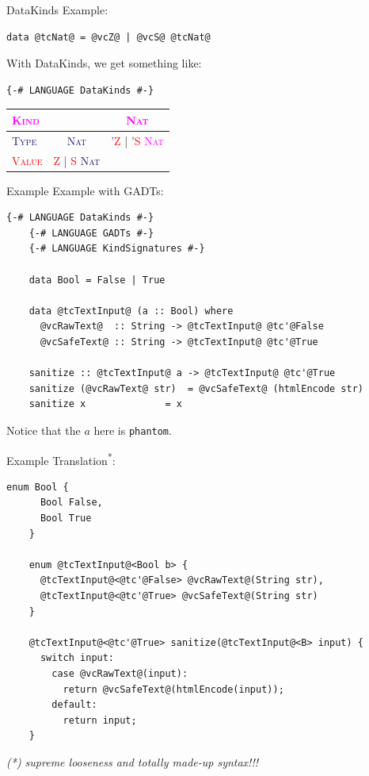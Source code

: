 \documentclass[xcolor={usenames,dvipsnames}]{beamer}
\newcommand{\htycon}[1]{\textcolor{MidnightBlue}{\textsc{#1}}}
\newcommand{\hvalcon}[1]{\textcolor{Red}{\textsc{#1}}}
\newcommand{\hkind}[1]{\textcolor{Fuchsia}{\textsc{#1}}}
\begin{document}
\begin{frame}[fragile]{DataKinds}
  Example:
  \begin{lstlisting}[style=hask]
    data @tcNat@ = @vcZ@ | @vcS@ @tcNat@
  \end{lstlisting}

  With DataKinds, we get something like:
  \begin{lstlisting}[style=hask]
    {-# LANGUAGE DataKinds #-}
  \end{lstlisting}
  \begin{tabular}{l || c | c}
    \hkind{Kind} & \ & \hkind{Nat} \\
    \hline \htycon{Type} & \htycon{Nat} & \htycon{'}\hvalcon{Z} | \htycon{'}\hvalcon{S} \hkind{Nat} \\
    \hline \hvalcon{Value} & \hvalcon{Z} | \hvalcon{S} \htycon{Nat} & \ \\
  \end{tabular}
\end{frame}

\begin{frame}[fragile]{Example}
  Example with GADTs:
  \begin{lstlisting}[style=hask]
    {-# LANGUAGE DataKinds #-}
    {-# LANGUAGE GADTs #-}
    {-# LANGUAGE KindSignatures #-}

    data Bool = False | True

    data @tcTextInput@ (a :: Bool) where
      @vcRawText@  :: String -> @tcTextInput@ @tc'@False
      @vcSafeText@ :: String -> @tcTextInput@ @tc'@True

    sanitize :: @tcTextInput@ a -> @tcTextInput@ @tc'@True
    sanitize (@vcRawText@ str)  = @vcSafeText@ (htmlEncode str)
    sanitize x              = x
  \end{lstlisting}
  \scriptsize{Notice that the $a$ here is \texttt{phantom}.}
\end{frame}

\begin{frame}[fragile]{Example}
  Translation\textsuperscript{*}:
  \begin{lstlisting}[style=hask]
    enum Bool {
      Bool False,
      Bool True
    }

    enum @tcTextInput@<Bool b> {
      @tcTextInput@<@tc'@False> @vcRawText@(String str),
      @tcTextInput@<@tc'@True> @vcSafeText@(String str)
    }

    @tcTextInput@<@tc'@True> sanitize(@tcTextInput@<B> input) {
      switch input:
        case @vcRawText@(input):
          return @vcSafeText@(htmlEncode(input));
        default:
          return input;
    }
  \end{lstlisting}
  \textit{\tiny{(*) supreme looseness and totally made-up syntax!!!}}
\end{frame}
\end{document}
